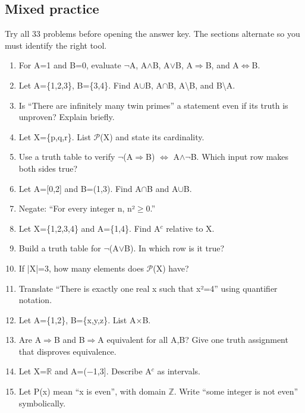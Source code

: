 \documentclass[11pt]{article}
\begin{document}
\begin{keepsection}
\section{Mixed practice}

Try all 33 problems before opening the answer key. The sections alternate so you must identify the right tool.

\begin{enumerate}
\item For A=1 and B=0, evaluate \ensuremath{\neg}A, A\ensuremath{\land}B, A\ensuremath{\lor}B, A\ensuremath{\Rightarrow}B, and A\ensuremath{\Leftrightarrow}B.
\item Let A=\{1,2,3\}, B=\{3,4\}. Find A\ensuremath{\cup}B, A\ensuremath{\cap}B, A\textbackslash{}B, and B\textbackslash{}A.
\item Is “There are infinitely many twin primes” a statement even if its truth is unproven? Explain briefly.
\item Let X=\{p,q,r\}. List \ensuremath{\mathcal{P}}(X) and state its cardinality.
\item Use a truth table to verify \ensuremath{\neg}(A\ensuremath{\Rightarrow}B) \ensuremath{\Leftrightarrow} A\ensuremath{\land}\ensuremath{\neg}B. Which input row makes both sides true?
\item Let A=[0,2] and B=(1,3). Find A\ensuremath{\cap}B and A\ensuremath{\cup}B.
\item Negate: “For every integer n, n²\ensuremath{\geq}0.”
\item Let X=\{1,2,3,4\} and A=\{1,4\}. Find A\ensuremath{^{c}} relative to X.
\item Build a truth table for \ensuremath{\neg}(A\ensuremath{\lor}B). In which row is it true?
\item If |X|=3, how many elements does \ensuremath{\mathcal{P}}(X) have?
\item Translate “There is exactly one real x such that x²=4” using quantifier notation.
\item Let A=\{1,2\}, B=\{x,y,z\}. List A\ensuremath{\times}B.
\item Are A\ensuremath{\Rightarrow}B and B\ensuremath{\Rightarrow}A equivalent for all A,B? Give one truth assignment that disproves equivalence.
\item Let X=\ensuremath{\mathbb{R}} and A=(\ensuremath{-}1,3]. Describe A\ensuremath{^{c}} as intervals.
\item Let P(x) mean “x is even”, with domain \ensuremath{\mathbb{Z}}. Write “some integer is not even” symbolically.

\end{enumerate}
\end{keepsection}
\end{document}

